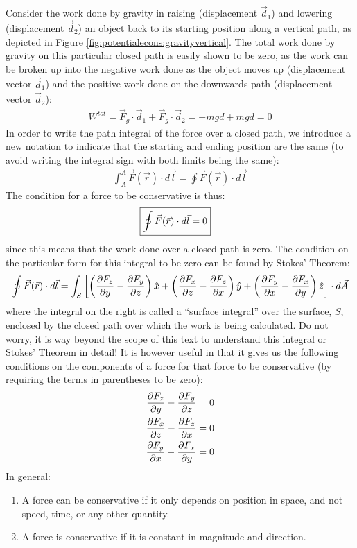 Consider the work done by gravity in raising (displacement $\vec d_1$) and lowering (displacement $\vec d_2$) an object back to its starting position along a vertical path, as depicted in Figure \ref{fig:potentialecons:gravityvertical}.
The total work done by gravity on this particular closed path is easily shown to be zero, as the work can be broken up into the negative work done as the object moves up (displacement vector $\vec d_1$) and the positive work done on the downwards path (displacement vector $\vec d_2$):
\begin{align*}
W^{tot} = \vec F_g \cdot \vec d_1 + \vec F_g \cdot \vec d_2 = -mgd + mgd = 0 
\end{align*}
In order to write the path integral of the force over a closed path, we introduce a new notation to indicate that the starting and ending position are the same (to avoid writing the integral sign with both limits being the same):
\begin{align*}
\int_A^A \vec F(\vec r) \cdot d\vec l = \oint \vec F(\vec r) \cdot d\vec l
\end{align*}
The condition for a force to be conservative is thus:
\begin{align}
\Aboxed{\oint \vec F(\vec r) \cdot d\vec l = 0}
\end{align}
since this means that the work done over a closed path is zero. The condition on the particular form for this integral to be zero can be found by Stokes' Theorem:
\begin{align*}
\oint \vec F(\vec r) \cdot d\vec l = \int_S \left[\left(\frac{\partial F_z}{\partial y}-\frac{\partial F_y}{\partial z}\right)\hat x+ \left(\frac{\partial F_x}{\partial z}-\frac{\partial F_z}{\partial x}\right)\hat y + \left(\frac{\partial F_y}{\partial x}-\frac{\partial F_x}{\partial y}\right)\hat z \right]\cdot d\vec A
\end{align*}
where the integral on the right is called a ``surface integral'' over the surface, $S$, enclosed by the closed path over which the work is being calculated. Do not worry, it is way beyond the scope of this text to understand this integral or Stokes' Theorem in detail! It is however useful in that it gives us the following conditions on the components of a force for that force to be conservative (by requiring the terms in parentheses to be zero):
\begin{align}
\label{eq:potentialecons:conservative}
\frac{\partial F_z}{\partial y}-\frac{\partial F_y}{\partial z} &= 0 \nonumber\\
\frac{\partial F_x}{\partial z}-\frac{\partial F_z}{\partial x} &= 0\nonumber\\
\frac{\partial F_y}{\partial x}-\frac{\partial F_x}{\partial y} &= 0
\end{align}
In general:
\begin{enumerate}
\item A force can be conservative if it only depends on position in space, and not speed, time, or any other quantity.
\item A force is conservative if it is constant in magnitude and direction.
\end{enumerate}

